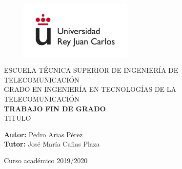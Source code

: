 \begin{figure}[t]
    \centering\includegraphics[width=0.5\textwidth]{figures/urjc_logo_letters.jpg}
\end{figure}

\begin{center}
    \textsc{ \Large{ESCUELA TÉCNICA SUPERIOR DE INGENIERÍA DE TELECOMUNICACIÓN \\}}
    \vspace{10mm}
	\textnormal{ \Large{GRADO EN INGENIERÍA  EN TECNOLOGÍAS DE LA TELECOMUNICACIÓN\\}}
	\vspace{25mm}
    \textup{\LARGE{\textbf{TRABAJO FIN DE GRADO}}} \\
    
    \vspace{25mm}
    \textnormal{ \Large{TITULO}}
\end{center}

\vspace{30mm}

\begin{center}
    \textnormal{\normalsize{\textbf{Autor:} Pedro Arias Pérez \\}}
    \textnormal{\normalsize{\textbf{Tutor:} José María Cañas Plaza \\}}

\end{center}

\vspace{20mm}

\begin{center}
   \normalsize{Curso académico 2019/2020} 
\end{center}
